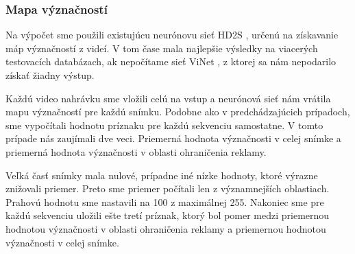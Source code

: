 \subsubsection{Mapa význačností}

Na výpočet sme použili existujúcu neurónovu sieť HD2S \cite{hd2s}, určenú na získavanie máp význačností z videí. V tom čase mala najlepšie výsledky na viacerých testovacích databázach, ak nepočítame sieť ViNet \cite{jain2021vinet}, z ktorej sa nám nepodarilo získať žiadny výstup.

Každú video nahrávku sme vložili celú na vstup a neurónová sieť nám vrátila mapu význačností pre každú snímku. Podobne ako v predchádzajúcich prípadoch, sme vypočítali hodnotu príznaku pre každú sekvenciu samostatne. V tomto prípade nás zaujímali dve veci. Priemerná hodnota význačnosti v celej snímke a priemerná hodnota význačnosti v oblasti ohraničenia reklamy.

Veľká časť snímky mala nulové, prípadne iné nízke hodnoty, ktoré výrazne znižovali priemer. Preto sme priemer počítali len z významnejších oblastiach. Prahovú hodnotu sme nastavili na 100 z maximálnej 255. Nakoniec sme pre každú sekvenciu uložili ešte tretí príznak, ktorý bol pomer medzi priemernou hodnotou význačnosti v oblasti ohraničenia reklamy a priemernou hodnotou význačnosti v celej snímke.


%
%
%
